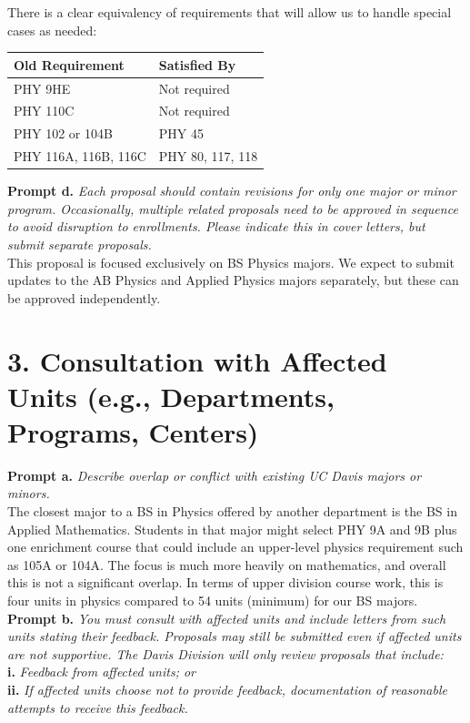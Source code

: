 \documentclass[12pt]{article}
\begin{document}
\noindent
There is a clear equivalency of requirements that will allow us to
handle special cases as needed:
\begin{center}
\begin{tabular}{ll}
Old Requirement & Satisfied By \\
\hline
PHY 9HE & Not required \\
PHY 110C & Not required \\
PHY 102 or 104B & PHY 45 \\
PHY 116A, 116B, 116C & PHY 80, 117, 118 \\
\end{tabular}
\end{center}

\noindent
{\bf Prompt d.} {\it Each proposal should contain revisions for only
  one major or minor program. Occasionally, multiple related proposals
  need to be approved in sequence to avoid disruption to
  enrollments. Please indicate this in cover letters, but submit
  separate proposals.}\\

\noindent
This proposal is focused exclusively on BS Physics majors.  We expect
to submit updates to the AB Physics and Applied Physics majors
separately, but these can be approved independently.

\section*{3. Consultation with Affected Units (e.g., Departments, Programs, Centers)}

{\bf Prompt a.} {\it Describe overlap or conflict with existing UC Davis majors or minors.}\\

\noindent
The closest major to a BS in Physics offered by another department is the
BS in Applied Mathematics.  Students in that major might select PHY 9A
and 9B plus one enrichment course that could include an upper-level
physics requirement such as 105A or 104A.  The focus is much more
heavily on mathematics, and overall this is not a significant overlap.
In terms of upper division course work, this is four units in physics
compared to 54 units (minimum) for our BS majors.\\

\noindent
{\bf Prompt b.} {\it You must consult with affected units and include letters from such units stating their feedback. Proposals may still be submitted even if affected units are not supportive. The Davis Division will only review proposals that include:}\\
{\bf i.} {\it Feedback from affected units; or}\\
{\bf ii.} {\it If affected units choose not to provide feedback, documentation of reasonable attempts to receive this feedback.}\\
\end{document}
